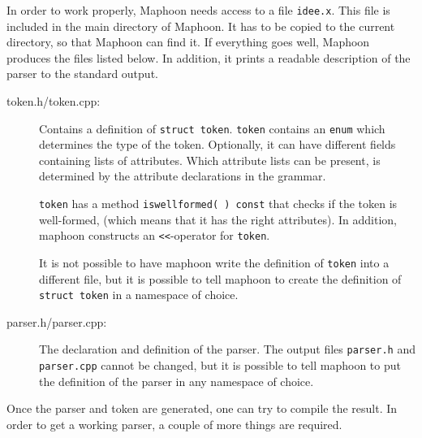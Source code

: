 \documentclass{article}
\begin{document}
In order to work properly, Maphoon needs access to a file
\verb+idee.x+. This file is included in the main directory of
Maphoon. It has to be copied to the current directory,
so that Maphoon can find it. 
If everything goes well, 
Maphoon produces the files listed below. 
In addition, it prints a readable description of the parser to the 
standard output.

\begin{description}
\item[token.h/token.cpp:]
   Contains a definition of \verb+struct token+.
   \verb+token+ contains an \verb+enum+ which determines the
   type of the token. Optionally, it can have different
   fields containing lists of attributes. 
   Which attribute lists can be present, is determined by the
   attribute declarations in the grammar.
   
   \verb+token+ has a method \verb+iswellformed( ) const+ that checks
   if the token is well-formed, (which means that it has
   the right attributes).
   In addition, maphoon constructs an \verb+<<+-operator
   for \verb+token+. 

   It is not possible to have maphoon write the 
   definition of \verb+token+ into a different file,
   but it is possible to tell maphoon to create the definition
   of \verb+struct token+ in a namespace of choice. 

\item[parser.h/parser.cpp:]
   The declaration and definition of the parser. 
   The output files \verb+parser.h+ and \verb+parser.cpp+ cannot be 
   changed, but it is possible to tell maphoon to put 
   the definition of the parser in any namespace of choice. 

\end{description}

\noindent
Once the parser and token are generated, one can try to 
compile the result.
In order to get a working parser, a couple of more things
are required.
\end{document}
